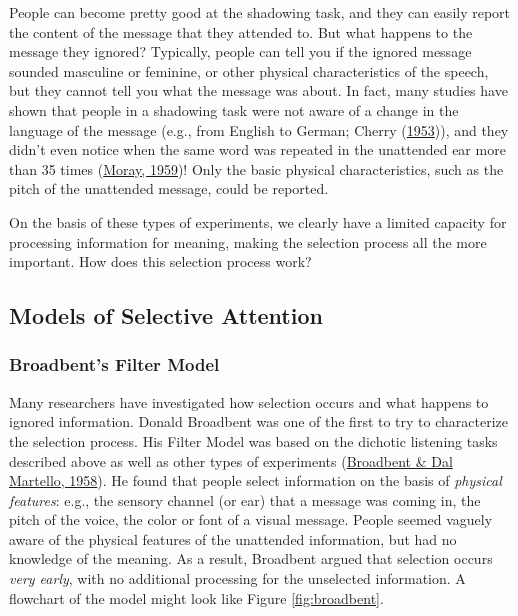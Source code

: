 \documentclass[
]{krantz}
\begin{document}
People can become pretty good at the shadowing task, and they can easily report the content of the message that they attended to. But what happens to the message they ignored? Typically, people can tell you if the ignored message sounded masculine or feminine, or other physical characteristics of the speech, but they cannot tell you what the message was about. In fact, many studies have shown that people in a shadowing task were not aware of a change in the language of the message (e.g., from English to German; Cherry (\protect\hyperlink{ref-Cherry1953}{1953})), and they didn't even notice when the same word was repeated in the unattended ear more than 35 times (\protect\hyperlink{ref-Moray1959}{Moray, 1959})! Only the basic physical characteristics, such as the pitch of the unattended message, could be reported.

On the basis of these types of experiments, we clearly have a limited capacity for processing information for meaning, making the selection process all the more important. How does this selection process work?

\hypertarget{models-of-selective-attention}{%
\subsection*{Models of Selective Attention}\label{models-of-selective-attention}}


\hypertarget{broadbents-filter-model}{%
\subsubsection*{Broadbent's Filter Model}\label{broadbents-filter-model}}


Many researchers have investigated how selection occurs and what happens to ignored information. Donald Broadbent was one of the first to try to characterize the selection process. His Filter Model was based on the dichotic listening tasks described above as well as other types of experiments (\protect\hyperlink{ref-Broadbent1958}{Broadbent \& Dal Martello, 1958}). He found that people select information on the basis of \emph{physical features}: e.g., the sensory channel (or ear) that a message was coming in, the pitch of the voice, the color or font of a visual message. People seemed vaguely aware of the physical features of the unattended information, but had no knowledge of the meaning. As a result, Broadbent argued that selection occurs \emph{very early}, with no additional processing for the unselected information. A flowchart of the model might look like Figure \ref{fig:broadbent}.
\end{document}
